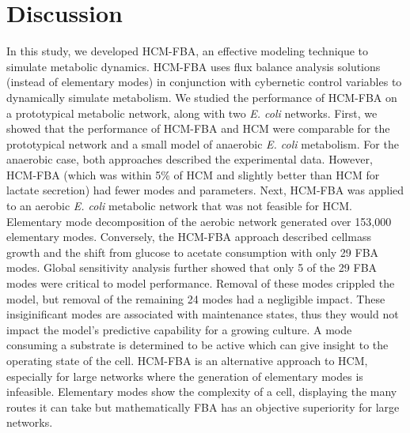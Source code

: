 \documentclass[10pt,twocolumn,twoside,final]{IEEEtran}
\begin{document}
\section{Discussion}
In this study, we developed HCM-FBA, an effective modeling technique to simulate metabolic dynamics.
HCM-FBA uses flux balance analysis solutions (instead of elementary modes) in conjunction with cybernetic control variables to dynamically simulate metabolism.
We studied the performance of HCM-FBA on a prototypical metabolic network, along with two \emph{E. coli} networks.
First, we showed that the performance of HCM-FBA and HCM were comparable for the prototypical network and a small model of anaerobic \textit{E. coli} metabolism.
For the anaerobic case, both approaches described the experimental data.
However, HCM-FBA (which was within 5\% of HCM and slightly better than HCM for lactate secretion) had fewer modes and parameters.
Next, HCM-FBA was applied to an aerobic \textit{E. coli} metabolic network that was not feasible for HCM.
Elementary mode decomposition of the aerobic network generated over 153,000 elementary modes.
Conversely, the HCM-FBA approach described cellmass growth and the shift from glucose to acetate consumption with only 29 FBA modes.
Global sensitivity analysis further showed that only 5 of the 29 FBA modes were critical to model performance.
Removal of these modes crippled the model, but removal of the remaining 24 modes had a negligible impact.
These insiginificant modes are associated with maintenance states, thus they would not impact the model's predictive capability for a growing culture.
A mode consuming a substrate is determined to be active which can give insight to the operating state of the cell.
HCM-FBA is an alternative approach to HCM, especially for large networks where the generation of elementary modes is infeasible. Elementary modes show the complexity of a cell, displaying the many routes it can take but mathematically FBA has an objective superiority for large networks.
\end{document}

